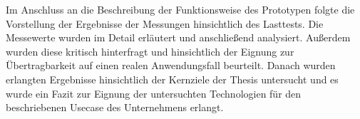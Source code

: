 Im Anschluss an die Beschreibung der Funktionsweise des Prototypen folgte die Vorstellung der Ergebnisse der Messungen hinsichtlich des Lasttests. Die Messewerte wurden im Detail erläutert und anschließend analysiert. Außerdem wurden diese kritisch hinterfragt und hinsichtlich der Eignung zur Übertragbarkeit auf einen realen Anwendungsfall beurteilt. Danach wurden erlangten Ergebnisse hinsichtlich der Kernziele der Thesis untersucht und es wurde ein Fazit zur Eignung der untersuchten Technologien für den beschriebenen Usecase des Unternehmens erlangt.
